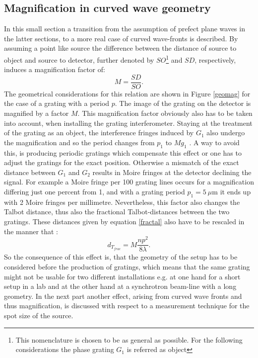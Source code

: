 \subsection{Magnification in curved wave geometry}\label{subsec:mag}
In this small section a transition from the assumption of prefect plane waves in the latter sections, to a more real case of curved wave-fronts is described. By assuming a point like source the difference between the distance of source to object and source to detector, further denoted by $SO$\footnote{This nomenclature is chosen to be as general as possible. For the following considerations the phase grating $G_{1}$ is referred as object} and $SD$, respectively, induces a magnification factor of: 
\begin{equation}\label{magnification}
M = \frac{SD}{SO}.
\end{equation}
The geometrical considerations for this relation are shown in Figure \ref{geomag} for the case of a grating with a period $p$. The image of the grating on the detector is magnified by a factor $M$. This magnification factor obviously also has to be taken into account, when installing the grating interferometer. Staying at the treatment of the grating as an object, the interference fringes induced by $G_{1}$ also undergo the magnification and so the period changes from $p_{1}$ to $Mg_{1}$ \citep{Bech2009}. A way to avoid this, is producing periodic gratings which compensate this effect or one has to adjust the gratings for the exact position. Otherwise a mismatch of the exact distance between $G_{1}$ and $G_{2}$ results in Moire fringes at the detector declining the signal. For example a Moire fringe per 100 grating lines occurs for a magnification differing just one percent from 1, and with a grating period $p_{1} = 5\ \mu$m it ends up with 2 Moire fringes per millimetre. Nevertheless, this factor also changes the Talbot distance, thus also the fractional Talbot-distances between the two gratings. These distances given by equation \ref{fractal} also have to be rescaled in the manner that \citep{Bech2009}:
\begin{equation}
d_{T_{frac}} = M \frac{n p^{2}}{8 \lambda}.
\end{equation}
So the consequence of this effect is, that the geometry of the setup has to be considered before the production of gratings, which means that the same grating might not be usable for two different installations e.g. at one hand for a short setup in a lab and at the other hand at a synchrotron beam-line with a long geometry. In the next part another effect, arising from curved wave fronts and thus magnification, is discussed with respect to a measurement technique for the spot size of the source.  
